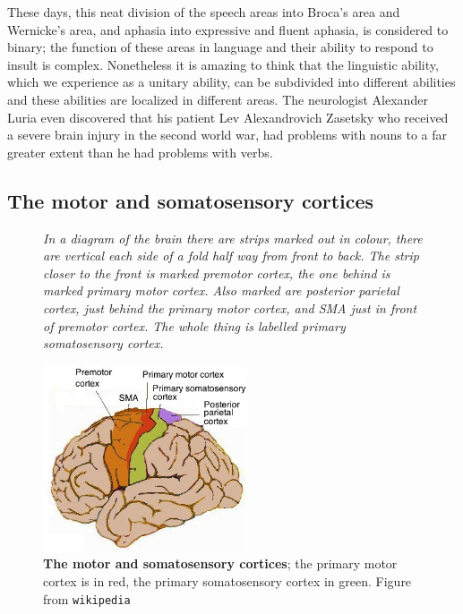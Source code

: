 \documentclass[12pt]{article}
\begin{document}
These days, this neat division of the speech areas into Broca's area
and Wernicke's area, and aphasia into expressive and fluent aphasia,
is considered to binary; the function of these areas in language and
their ability to respond to insult is complex. Nonetheless it is
amazing to think that the linguistic ability, which we experience as a
unitary ability, can be subdivided into different abilities and these
abilities are localized in different areas. The neurologist Alexander
Luria even discovered that his patient Lev Alexandrovich Zasetsky who
received a severe brain injury in the second world war, had problems
with nouns to a far greater extent than he had problems with verbs.

\subsection*{The motor and somatosensory cortices}


\begin{figure}[tbhp]
{\textsl{In a diagram of the brain there are strips marked out in colour, there are vertical each side of a fold half way from front to back. The strip closer to the front is marked premotor cortex, the one behind is marked primary motor cortex. Also marked are posterior parietal cortex, just behind the primary motor cortex, and SMA just in front of premotor cortex. The whole thing is labelled primary somatosensory cortex.}}
{
  \begin{center}
\includegraphics[width=6cm]{Human_motor_cortex.jpg}
  \end{center}
  }
  \caption{\textbf{The motor and somatosensory cortices}; the primary motor
    cortex is in red, the primary somatosensory cortex in green. Figure from
    \texttt{wikipedia}\label{fig_m_and_s}}
\end{figure}
\end{document}

